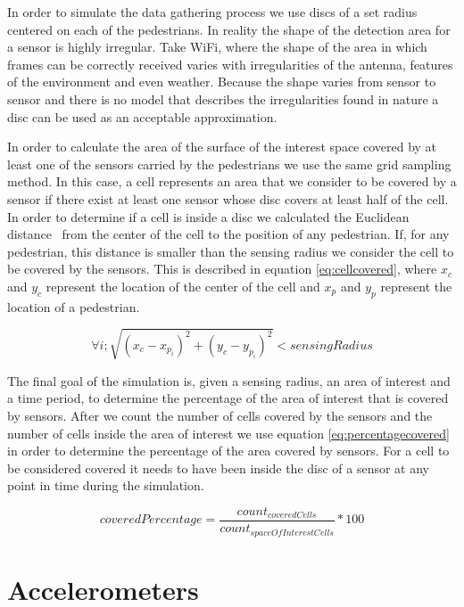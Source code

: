 In order to simulate the data gathering process we use discs of a set radius centered on each of the pedestrians. In reality the shape of the detection area for a sensor is highly irregular. Take WiFi, where the shape of the area in which frames can be correctly received varies with irregularities of the antenna, features of the environment and even weather. Because the shape varies from sensor to sensor and there is no model that describes the irregularities found in nature a disc can be used as an acceptable approximation.

In order to calculate the area of the surface of the interest space covered by at least one of the sensors carried by the pedestrians we use the same grid sampling method. In this case, a cell represents an area that we consider to be covered by a sensor if there exist at least one sensor whose disc covers at least half of the cell. In order to determine if a cell is inside a disc we calculated the Euclidean distance~\cite{deza2009encyclopedia} from the center of the cell to the position of any pedestrian. If, for any pedestrian, this distance is smaller than the sensing radius we consider the cell to be covered by the sensors. This is described in equation \ref{eq:cellcovered}, where $x_c$ and $y_c$ represent the location of the center of the cell and $x_p$ and $y_p$ represent the location of a pedestrian.

\begin{equation}
\forall i; \sqrt{(x_{c}-x_{p_i})^2 + (y_{c}-y_{p_i})^2}<sensingRadius
\label{eq:cellcovered}
\end{equation}

The final goal of the simulation is, given a sensing radius, an area of interest and a time period, to determine the percentage of the area of interest that is covered by sensors. After we count the number of cells covered by the sensors and the number of cells inside the area of interest we use equation \ref{eq:percentagecovered} in order to determine the percentage of the area covered by sensors. For a cell to be considered covered it needs to have been inside the disc of a sensor at any point in time during the simulation.

\begin{equation}
coveredPercentage = \frac{count_{coveredCells}}{count_{spaceOfInterestCells}} *100
\label{eq:percentagecovered}
\end{equation}

\section{Accelerometers}
\label{sec:exp-acc}

